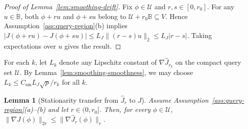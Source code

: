 \documentclass[11pt, letterpaper, oneside, reqno]{amsart}
\newtheorem{lemma}{Lemma}
\begin{document}
\begin{proof}[Proof of Lemma~\ref{lem:smoothing-drift}]
Fix $\phi\in\mathcal U$ and $r,s\in[0,r_0]$.
For any $u\in\mathbb B$, both $\phi+r u$ and $\phi+s u$ belong to $\mathcal U+r_0\mathbb B\subseteq V$.
Hence Assumption~\ref{ass:query-region}(b) implies
$\big|J(\phi+r u)-J(\phi+s u)\big|
\le L_J\|(r-s)u\|_2
\le L_J|r-s|$.
Taking expectations over $u$ gives the result.
\end{proof}


For each $k$, let $L_k$ denote any Lipschitz constant of $\nabla \hat J_{r_k}$ on the compact query set $\mathcal U$.
By Lemma~\ref{lem:smoothing-smoothness}, we may choose $L_k \le C_{\mathrm{sm}}L_J\sqrt p / r_k$ for all $k$.

\begin{lemma}[Stationarity transfer from $\hat J_r$ to $J$]
\label{lem:transfer}
Assume Assumption~\ref{ass:query-region}(a)--(b) and let $r\in(0,r_0]$.
Then, for every $\phi\in\mathcal U$,
$\|\nabla J(\phi)\|_{2r}
\le \|\nabla \hat J_r(\phi)\|_{r}$.
\end{lemma}
\end{document}
